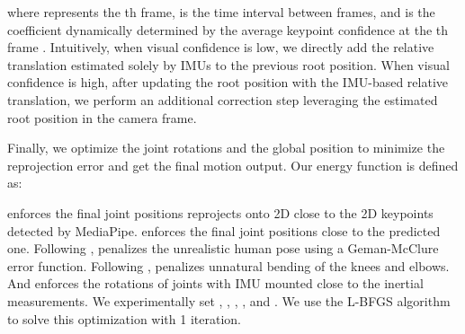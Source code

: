\documentclass[sigconf,nonacm=true]{acmart}
\begin{document}
where  represents the th frame,  is the time interval between frames, and  is the coefficient dynamically determined by the average keypoint confidence at the th frame .
Intuitively, when visual confidence is low, we directly add the relative translation estimated solely by IMUs to the previous root position.
When visual confidence is high, after updating the root position with the IMU-based relative translation, we perform an additional correction step leveraging the estimated root position in the camera frame.
\par
Finally, we optimize the joint rotations  and the global position  to minimize the reprojection error and get the final motion output.
Our energy function is defined as:

 enforces the final joint positions reprojects onto 2D close to the 2D keypoints detected by MediaPipe.  enforces the final joint positions close to the predicted one.
Following \cite{smplify},  penalizes the unrealistic human pose using a Geman-McClure \cite{geman-mcclure} error function.
Following \cite{smplify},  penalizes unnatural bending of the knees and elbows.
And  enforces the rotations of joints with IMU mounted close to the inertial measurements.
We experimentally set , , , , and .
We use the L-BFGS \cite{lbfgs} algorithm to solve this optimization with 1 iteration.
\end{document}
